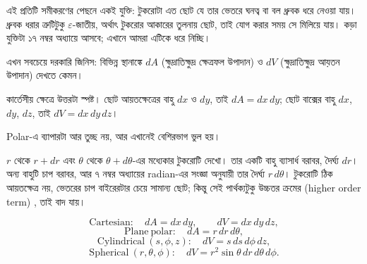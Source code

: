 \documentclass[11pt]{article}
\begin{document}
এই প্রতিটি সমীকরণের পেছনে একই যুক্তি: টুকরোটা এত ছোট যে তার ভেতরে ঘনত্ব বা
বল ধ্রুবক ধরে নেওয়া যায়। ধ্রুবক ধরার ত্রুটিটুকু $\varepsilon$-জাতীয়, অর্থাৎ
টুকরোর আকারের তুলনায় ছোট, তাই যোগ করার সময় সে মিলিয়ে যায়। কড়া যুক্তিটা
১৭ নম্বর অধ্যায়ে আসবে; এখানে আমরা এটিকে ধরে নিচ্ছি।

এখন সবচেয়ে দরকারি জিনিস: বিভিন্ন স্থানাঙ্কে $dA$ (ক্ষুদ্রাতিক্ষুদ্র ক্ষেত্রফল উপাদান) ও $dV$ (ক্ষুদ্রাতিক্ষুদ্র আয়তন উপাদান) দেখতে কেমন।

কার্তেসীয় ক্ষেত্রে উত্তরটা স্পষ্ট। ছোট আয়তক্ষেত্রের বাহু $dx$ ও $dy$, তাই
$dA = dx\,dy$; ছোট বাক্সের বাহু $dx$, $dy$, $dz$, তাই $dV = dx\,dy\,dz$।

Polar-এ ব্যাপারটা আর তুচ্ছ নয়, আর এখানেই বেশিরভাগ ভুল হয়।

\begin{center}
\end{center}

$r$ থেকে $r+dr$ এবং $\theta$ থেকে $\theta+d\theta$-এর মধ্যেকার টুকরোটি দেখো।
তার একটি বাহু ব্যাসার্ধ বরাবর, দৈর্ঘ্য $dr$। অন্য বাহুটি চাপ বরাবর, আর
৭ নম্বর অধ্যায়ের radian-এর সংজ্ঞা অনুযায়ী তার দৈর্ঘ্য $r\,d\theta$।
টুকরোটি ঠিক আয়তক্ষেত্র নয়, ভেতরের চাপ বাইরেরটার চেয়ে সামান্য ছোট; কিন্তু
সেই পার্থক্যটুকু উচ্চতর ক্রমের (higher order term)  , তাই বাদ যায়।

\begin{idea}[ক্ষেত্রফল ও আয়তন উপাদান]
\[
  \mathrm{Cartesian:} \quad dA = dx\,dy, \qquad dV = dx\,dy\,dz ,
\]
\[
  \mathrm{Plane\ polar:} \quad dA = r\,dr\,d\theta ,
\]
\[
  \mathrm{Cylindrical\ } (s,\phi,z): \quad dV = s\,ds\,d\phi\,dz ,
\]
\[
  \mathrm{Spherical\ } (r,\theta,\phi): \quad
  dV = r^{2}\sin\theta\,dr\,d\theta\,d\phi .
\]
\end{idea}
\end{document}
